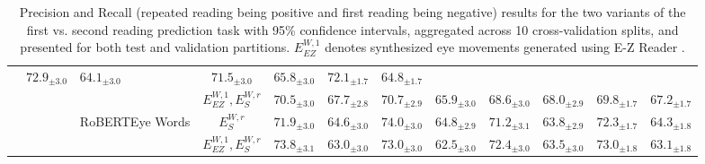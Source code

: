 \begin{table*}[ht]
{\begin{tabular}{lllc*{4}{cc}}
              & $72.9_{\pm3.0}$ & $64.1_{\pm3.0}$ 
              & $71.5_{\pm3.0}$ & $65.8_{\pm3.0}$ 
              & $72.1_{\pm1.7}$ & $64.8_{\pm1.7}$ \\[1ex]
      & 
          & 
              & $E_{EZ}^{W,1},E_S^{W,r}$ 
              & $70.5_{\pm3.0}$ & $67.7_{\pm2.8}$ 
              & $70.7_{\pm2.9}$ & $65.9_{\pm3.0}$ 
              & $68.6_{\pm3.0}$ & $68.0_{\pm2.9}$ 
              & $69.8_{\pm1.7}$ & $67.2_{\pm1.7}$ \\ \cmidrule{3-12}
      & 
          & \multirow{2}{*}{RoBERTEye Words} 
              & $E_S^{W,r}$ 
              & $71.9_{\pm3.0}$ & $64.6_{\pm3.0}$ 
              & $74.0_{\pm3.0}$ & $64.8_{\pm2.9}$ 
              & $71.2_{\pm3.1}$ & $63.8_{\pm2.9}$ 
              & $72.3_{\pm1.7}$ & $64.3_{\pm1.8}$ \\[1ex]
      & 
          & 
              & $E_{EZ}^{W,1},E_S^{W,r}$ 
              & $73.8_{\pm3.1}$ & $63.0_{\pm3.0}$ 
              & $73.0_{\pm3.0}$ & $62.5_{\pm3.0}$ 
              & $72.4_{\pm3.0}$ & $63.5_{\pm3.0}$ 
              & $73.0_{\pm1.8}$ & $63.1_{\pm1.8}$ \\
    \bottomrule
  \end{tabular}%
}
\caption{Precision and Recall (repeated reading being positive and first reading being negative) results for the two variants of the first vs. second reading prediction task with 95\% confidence intervals, aggregated across 10 cross-validation splits, and presented for both test and validation partitions. $E_{EZ}^{W,1}$ denotes synthesized eye movements generated using \mbox{E-Z} Reader \cite{reichle2003ez}.}
\label{app:tab:prec_recall}
\end{table*}



